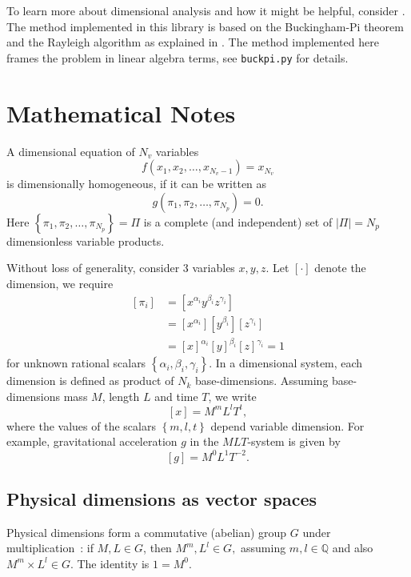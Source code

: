 \documentclass[11pt]{article}
\begin{document}
To learn more about dimensional analysis and how it might be helpful, consider \cite{szirtes2007applied, santiago2019first, sonin2001dimensional, lemons2017student,schetz1999fundamentals}. The method implemented in this library is based on the Buckingham-Pi theorem and the Rayleigh algorithm as explained in \cite{szirtes2007applied}. The method implemented here frames the problem in linear algebra terms, see \texttt{buckpi.py} for details.

\section{Mathematical Notes}
A dimensional equation of $N_v$ variables
\begin{equation}
    f(x_1,x_2,\ldots,x_{N_v-1}) = x_{N_v} \label{eq:fnc}
\end{equation}
is dimensionally homogeneous, if it can be written as
\begin{equation}
    g(\pi_1,\pi_2,\ldots,\pi_{N_p}) = 0.
\end{equation}
Here $\left\{\pi_1,\pi_2,\ldots,\pi_{N_p}\right\} = \Pi$ is a complete (and independent) set of $|\Pi|={N_p}$ dimensionless variable products. 

Without loss of generality, consider 3 variables $x,y,z$. Let $\left[\cdot\right]$ denote the dimension, we require
\begin{align}
    \left[\pi_i\right] &= \left[x^{\alpha_i}y^{\beta_i}z^{\gamma_i} \right] \\
    &=\left[x^{\alpha_i}\right]\left[y^{\beta_i}\right]\left[z^{\gamma_i}\right] \\
    &=\left[x\right]^{\alpha_i}\left[y\right]^{\beta_i}\left[z\right]^{\gamma_i} = 1 \label{eq:pi}    
\end{align}
for unknown rational scalars $\left\{\alpha_i,\beta_i,\gamma_i\right\}.$ In a dimensional system, each dimension is defined as product of $N_k$ base-dimensions. Assuming base-dimensions mass $M$, length $L$ and time $T$, we write 
\begin{equation}
    \left[x\right] = M^mL^lT^t, \label{eq:xinmlt}
\end{equation}
where the values of the scalars $\left\{m,l,t\right\}$ depend variable dimension. For example, gravitational acceleration $g$ in the $MLT$-system is given by
\begin{equation}
    \left[g\right] = M^0L^1T^{-2}.
\end{equation}

\subsection{Physical dimensions as vector spaces}
Physical dimensions form a commutative (abelian) group $G$ under multiplication~\cite{wiki:Dimensional_analysis}: if $M,L \in G$, then $M^m,L^l \in G,$ assuming $m,l \in \mathbb{Q}$ and also $M^m \times L^l \in G$. The identity is $1 = M^0$.
\end{document}

